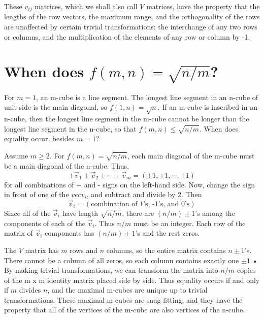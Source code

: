 These $v_{ij}$ matrices, which we shall also call $V$ matrices, have the
property that the lengths of the row vectors, the maximum range, and the
orthogonality of the rows are unaffected by certain trivial
transformations: the interchange of any two rows or columns, and the
multiplication of the elements of any row or column by -1.

\section*{When does $f(m,n) = \sqrt{n/m}$?}

For $m = 1$, an m-cube is a line segment. The longest line segment in
an n-cube of unit side is the main diagonal, so $f(1,n) = \sqrt{n}$. If an
m-cube is inscribed in an n-cube, then the longest line segment in the m-cube
cannot be longer than the longest line segment in the n-cube, so that
$f(m,n) \leq \sqrt{n/m}$. When does equality occur, besides $m = 1$?

Assume $m \geq 2$. For $f(m,n) = \sqrt{n/m}$, each main diagonal of the m-cube
must be a main diagonal of the n-cube. Thus,
\begin{equation*}
\pm \vec{v}_1 \pm \vec{v}_2 \pm \cdots \pm \vec{v}_m = (\pm 1, \pm 1, \cdots, \pm 1)
\end{equation*}
for all combinations of + and - signs on the left-hand side. Now, change
the sign in front of one of the $vec{v}_i$, and subtract and divide by 2. Then
\begin{equation*}
\vec{v}_i = (\text{combination of 1's, -1's, and 0's})
\end{equation*}
Since all of the $\vec{v}_i$ have length $\sqrt{n/m}$, there are $(n/m) \pm 1$'s
among the components of each of the $\vec{v}_i$. Thus $n/m$ must be an integer.
Each row of the matrix of $\vec{v}_i$ components has $(n/m) \pm 1$'s and the
rest zeros.

The $V$ matrix has $m$ rows and $n$ columns, so the entire matrix
contains $n \pm 1$'s. There cannot be a column of all zeros, so each column
contains exactly one $\pm 1$.• By making trivial transformations, we can
transform the matrix into $n/m$ copies of the m x m identity matrix placed
side by side. Thus equality occurs if and only if $m$ divides $n$, and the
maximal m-cubes are unique up to trivial transformations. These maximal
m-cubes are snug-fitting, and they have the property that all of the
vertices of the m-cube are also vertices of the n-cube.

